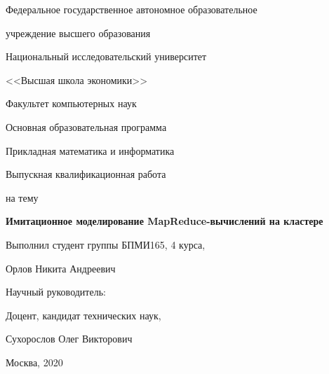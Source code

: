 
\large
\bigskip

\begin{center}
{\large Федеральное государственное автономное образовательное 

учреждение высшего образования

Национальный исследовательский университет

\smallskip

<<Высшая школа экономики>>

}

\bigskip
\bigskip
\bigskip

{ \large
Факультет компьютерных наук

Основная образовательная программа

Прикладная математика и информатика
}
\end{center}

\begin{center}
  {\large Выпускная квалификационная работа}
  
  {\large на тему}
\end{center}

\begin{center}
  \textbf{\huge Имитационное моделирование MapReduce-вычислений на кластере}
\end{center}


\renewcommand{\arraystretch}{1.8} %

\bigskip
\bigskip
\bigskip
\bigskip

{\large Выполнил студент группы БПМИ165, 4 курса,

\hspace{3cm} Орлов Никита Андреевич


Научный руководитель:

\hspace{3cm} Доцент, кандидат технических наук,

\hspace{3cm} Сухорослов Олег Викторович


\hspace{3cm}

\hspace{3cm}

}
    
\bigskip
\bigskip

\bigskip
\bigskip
\bigskip
\pagestyle{empty}

\vfill
\begin{center}
  {Москва, 2020}
\end{center}

\newpage
